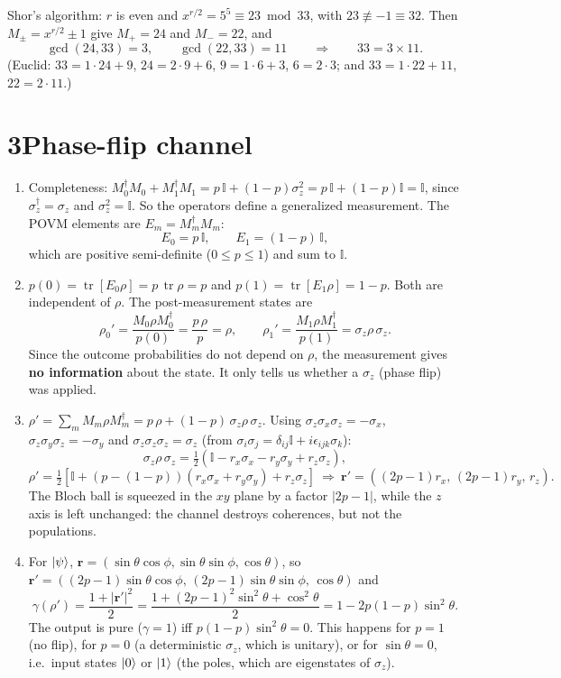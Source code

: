 \documentclass[11pt,a4paper]{article}
\newcommand{\tr}{\operatorname{tr}}
\newcommand{\id}{\mathbb{I}}
\begin{document}
\begin{enumerate}
Shor's algorithm: $r$ is even and $x^{r/2}=5^5\equiv23\bmod33$, with $23\not\equiv-1\equiv32$. Then
$M_\pm=x^{r/2}\pm1$ give $M_+=24$ and $M_-=22$, and
\[
\gcd(24,33)=3,\qquad\gcd(22,33)=11\qquad\Rightarrow\qquad 33=3\times11 .
\]
(Euclid: $33=1\cdot24+9$, $24=2\cdot9+6$, $9=1\cdot6+3$, $6=2\cdot3$; and $33=1\cdot22+11$, $22=2\cdot11$.)
\end{enumerate}

\section*{3\quad Phase-flip channel}

\begin{enumerate}
\item Completeness: $M_0^\dagger M_0+M_1^\dagger M_1=p\,\id+(1-p)\sigma_z^2=p\,\id+(1-p)\id=\id$, since
$\sigma_z^\dagger=\sigma_z$ and $\sigma_z^2=\id$. So the operators define a generalized measurement. The
POVM elements are $E_m=M_m^\dagger M_m$:
\[
E_0=p\,\id,\qquad E_1=(1-p)\,\id,
\]
which are positive semi-definite ($0\le p\le1$) and sum to $\id$.

\item $p(0)=\tr[E_0\rho]=p\,\tr\rho=p$ and $p(1)=\tr[E_1\rho]=1-p$. Both are independent of $\rho$.
The post-measurement states are
\[
\rho_0'=\frac{M_0\rho M_0^\dagger}{p(0)}=\frac{p\,\rho}{p}=\rho,\qquad
\rho_1'=\frac{M_1\rho M_1^\dagger}{p(1)}=\sigma_z\rho\,\sigma_z .
\]
Since the outcome probabilities do not depend on $\rho$, the measurement gives \textbf{no
information} about the state. It only tells us whether a $\sigma_z$ (phase flip) was applied.

\item $\rho'=\sum_mM_m\rho M_m^\dagger=p\,\rho+(1-p)\,\sigma_z\rho\,\sigma_z$. Using
$\sigma_z\sigma_x\sigma_z=-\sigma_x$, $\sigma_z\sigma_y\sigma_z=-\sigma_y$ and $\sigma_z\sigma_z\sigma_z=\sigma_z$
(from $\sigma_i\sigma_j=\delta_{ij}\id+i\epsilon_{ijk}\sigma_k$):
\[
\sigma_z\rho\,\sigma_z=\tfrac12\left(\id-r_x\sigma_x-r_y\sigma_y+r_z\sigma_z\right),
\]
\[
\rho'=\tfrac12\left[\id+(p-(1-p))(r_x\sigma_x+r_y\sigma_y)+r_z\sigma_z\right]
\ \Rightarrow\ \bm r'=\left((2p-1)r_x,\,(2p-1)r_y,\,r_z\right).
\]
The Bloch ball is squeezed in the $xy$ plane by a factor $|2p-1|$, while the $z$ axis is left
unchanged: the channel destroys coherences, but not the populations.

\item For $\ket\psi$, $\bm r=(\sin\theta\cos\phi,\sin\theta\sin\phi,\cos\theta)$, so
$\bm r'=\left((2p-1)\sin\theta\cos\phi,\,(2p-1)\sin\theta\sin\phi,\,\cos\theta\right)$ and
\[
\gamma(\rho')=\frac{1+|\bm r'|^2}{2}=\frac{1+(2p-1)^2\sin^2\theta+\cos^2\theta}{2}=1-2p(1-p)\sin^2\theta .
\]
The output is pure ($\gamma=1$) iff $p(1-p)\sin^2\theta=0$. This happens for $p=1$ (no flip), for $p=0$
(a deterministic $\sigma_z$, which is unitary), or for $\sin\theta=0$, i.e.\ input states $\ket0$ or $\ket1$
(the poles, which are eigenstates of $\sigma_z$).


\end{enumerate}
\end{document}
